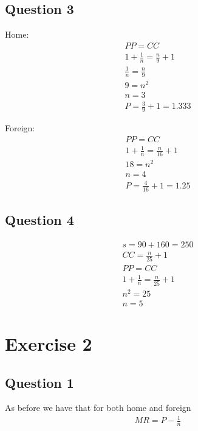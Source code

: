 \documentclass{article}
\begin{document}
\vspace{6mm}
\subsection{Question 3}

Home:
\begin{gather*}
  PP = CC \\
  1 + \frac{1}{n} = \frac{n}{9} + 1 \\
  \frac{1}{n} = \frac{n}{9} \\
  9 = n^{2} \\
  n = 3 \\
  P = \frac{3}{9} + 1 = 1.333
\end{gather*}

Foreign:
\begin{gather*}
  PP = CC \\
  1 + \frac{1}{n} = \frac{n}{16} + 1 \\
  18 = n^{2} \\
  n = 4 \\
  P = \frac{4}{16} + 1 = 1.25
\end{gather*}


\vspace{6mm}
\subsection{Question 4}

\begin{gather*}
  s = 90 + 160 = 250 \\
  CC = \frac{n}{25} + 1 \\
  PP = CC \\
  1 + \frac{1}{n} = \frac{n}{25} + 1 \\
  n^{2} = 25 \\
  n = 5
\end{gather*}




\section{Exercise 2}
\vspace{6mm}
\subsection{Question 1}

As before we have that for both home and foreign
\begin{gather*}
  MR = P - \frac{1}{n}
\end{gather*}
\end{document}
